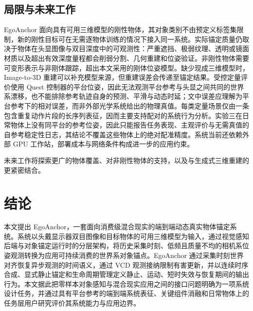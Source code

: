 \documentclass[review]{vgtc}
\begin{document}
\subsection{局限与未来工作}


EgoAnchor 面向具有可用三维模型的刚性物体，其对象类别不由预定义标签集限制，新的刚性目标可在无需逐物体训练的情况下接入同一系统。实际锚定质量仍取决于物体在头显图像与双目深度中的可观测性：严重遮挡、极弱纹理、透明或镜面材质以及超出有效深度量程都会削弱分割、几何重建和位姿验证。非刚性物体需要可变形表示与非刚体跟踪，超出本文采用的刚体位姿模型。缺少现成三维模型时，Image-to-3D 重建可以补充模型来源，但重建误差会传递至锚定结果。受控定量评价使用 Quest 控制器的平台位姿，因此无法观测平台参考与头显之间共同的世界系漂移，也不能排除参考轨迹自身的预测、平滑与动态时延；文中误差应理解为平台参考下的相对误差，而非外部光学系统给出的物理真值。每类定量场景仅由一条包含重复动作片段的长序列表征，因而主要支持配对的系统行为分析。实验三在日常物体上没有同平台的参考位姿，因此只能报告任务表现、主观评价与无需真值的自参考稳定性日志，其结论不覆盖这些物体上的绝对配准精度。系统当前还依赖外部 GPU 工作站，部署成本与网络条件构成进一步的应用约束。

未来工作将探索更广的物体覆盖、对非刚性物体的支持，以及与生成式三维重建的更紧密结合。

\section{结论}\label{sec:conclusion}

本文提出 EgoAnchor，一套面向消费级混合现实的端到端动态真实物体锚定系统。系统以头戴显示器双目图像和目标物体的可用三维模型为输入，通过视觉感知后端与对象锚定运行时的分层架构，将历史采集时刻、低频且质量不均的相机系位姿观测转换为应用可持续消费的世界系对象锚点。EgoAnchor 通过采集时刻世界对齐恢复异步观测的时间语义，通过 VCD 观测接纳限制有害更新，并以连续时序合成、显式静止锚定和生命周期管理定义静止、运动、短时失效与恢复期间的输出行为。本文据此把零样本对象感知与混合现实应用之间的接口问题明确为一项系统设计任务，并通过具有平台参考的端到端系统表征、关键组件消融和日常物体上的任务层用户研究评价其系统能力与应用边界。

\clearpage
\raggedbottom



\end{document}
